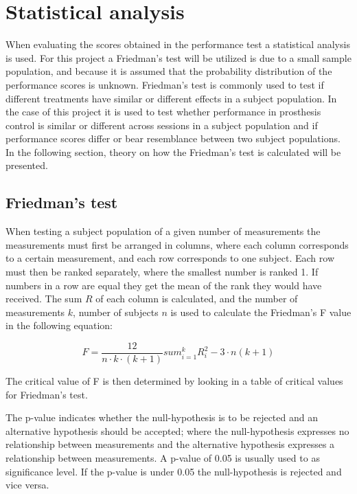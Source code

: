 \section{Statistical analysis}
When evaluating the scores obtained in the performance test a statistical analysis is used. For this project a Friedman's test will be utilized is due to a small sample population, and because it is assumed that the probability distribution of the performance scores is unknown. Friedman's test is commonly used to test if different treatments have similar or different effects in a subject population. In the case of this project it is used to test whether performance in prosthesis control is similar or different across sessions in a subject population and if performance scores differ or bear resemblance between two subject populations. In the following section, theory on how the Friedman's test is calculated will be presented.

\subsection{Friedman's test}
When testing a subject population of a given number of measurements the measurements must first be arranged in columns, where each column corresponds to a certain measurement, and each row corresponds to one subject. Each row must then be ranked separately, where the smallest number is ranked 1. If numbers in a row are equal they get the mean of the rank they would have received. The sum $R$ of each column is calculated, and the number of measurements $k$, number of subjects $n$ is used to calculate the Friedman's F value in the following equation:

\begin{equation}
	F = \frac{12}{n \cdot k \cdot (k+1)} sum_{i=1}^{k} R_{i}^{2} - 3 \cdot n(k + 1)
\end{equation}

The critical value of F is then determined by looking in a table of critical values for Friedman's test. 

The p-value indicates whether the null-hypothesis is to be rejected and an alternative hypothesis should be accepted; where the null-hypothesis expresses no relationship between measurements and the alternative hypothesis expresses a relationship between measurements. A p-value of 0.05 is usually used to as significance level. If the p-value is under 0.05 the null-hypothesis is rejected and vice versa. 





 


